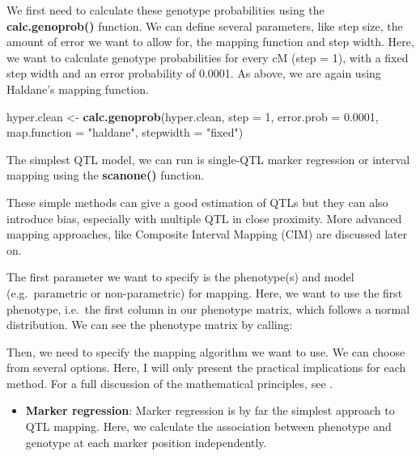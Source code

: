 \documentclass[12pt,]{book}
\newenvironment{Shaded}{\begin{snugshade}}{\end{snugshade}}
\newcommand{\KeywordTok}[1]{\textcolor[rgb]{0.27,0.27,0.27}{\textbf{{#1}}}}
\newcommand{\DataTypeTok}[1]{\textcolor[rgb]{0.27,0.27,0.27}{{#1}}}
\newcommand{\DecValTok}[1]{\textcolor[rgb]{0.06,0.06,0.06}{{#1}}}
\newcommand{\FloatTok}[1]{\textcolor[rgb]{0.06,0.06,0.06}{{#1}}}
\newcommand{\StringTok}[1]{\textcolor[rgb]{0.5,0.5,0.5}{{#1}}}
\newcommand{\NormalTok}[1]{{#1}}
\providecommand{\tightlist}{%
  \setlength{\itemsep}{0pt}\setlength{\parskip}{0pt}}
\begin{document}
We first need to calculate these genotype probabilities using the
\textbf{calc.genoprob()} function. We can define several parameters,
like step size, the amount of error we want to allow for, the mapping
function and step width. Here, we want to calculate genotype
probabilities for every cM (step = 1), with a fixed step width and an
error probability of 0.0001. As above, we are again using Haldane's
mapping function.

\begin{Shaded}
\begin{Highlighting}[]
\NormalTok{hyper.clean <-}\StringTok{ }\KeywordTok{calc.genoprob}\NormalTok{(hyper.clean, }\DataTypeTok{step =} \DecValTok{1}\NormalTok{, }\DataTypeTok{error.prob =} \FloatTok{0.0001}\NormalTok{, }\DataTypeTok{map.function =} \StringTok{"haldane"}\NormalTok{, }\DataTypeTok{stepwidth =} \StringTok{"fixed"}\NormalTok{)}
\end{Highlighting}
\end{Shaded}

The simplest QTL model, we can run is single-QTL marker regression or
interval mapping using the \textbf{scanone()} function.

These simple methods can give a good estimation of QTLs but they can
also introduce bias, especially with multiple QTL in close proximity.
More advanced mapping approaches, like Composite Interval Mapping (CIM)
are discussed later on.

The first parameter we want to specify is the phenotype(s) and model
(e.g.~parametric or non-parametric) for mapping. Here, we want to use
the first phenotype, i.e.~the first column in our phenotype matrix,
which follows a normal distribution. We can see the phenotype matrix by
calling:

\begin{Shaded}
\end{Shaded}

Then, we need to specify the mapping algorithm we want to use. We can
choose from several options. Here, I will only present the practical
implications for each method. For a full discussion of the mathematical
principles, see \citet{lynch1998genetics}.

\begin{itemize}
\tightlist
\item
  \textbf{Marker regression}: Marker regression is by far the simplest
  approach to QTL mapping. Here, we calculate the association between
  phenotype and genotype at each marker position independently.
\end{itemize}
\end{document}

